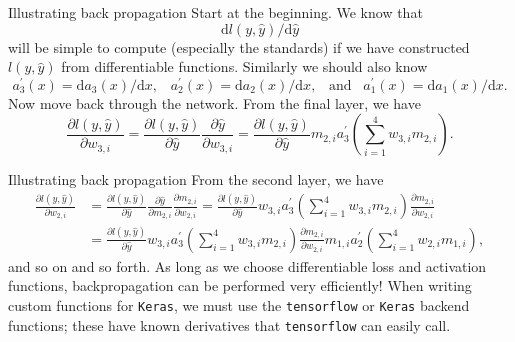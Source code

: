 \documentclass{beamer}
\begin{document}
\begin{frame}{Illustrating back propagation}
Start at the beginning. We know that
\[
\mathrm{d} l(y,\hat{y}) / \mathrm{d}\hat{y}
\] 
will be simple to compute (especially the standards) if we have constructed $l(y,\hat{y}) $ from differentiable functions. Similarly we should also know
\[
a_3^{'}(x)=\mathrm{d}a_3(x)/\mathrm{d}x,\;\;\; a_2^{'}(x)=\mathrm{d}a_2(x)/\mathrm{d}x,\;\;\;\text{and} \;\;\;a_1^{'}(x)=\mathrm{d}a_1(x)/\mathrm{d}x.
\]
Now move back through the network. From the final layer, we  have
\[
\frac{\partial l(y,\hat{y})}{\partial w_{3,i}} = \frac{\partial l(y,\hat{y}) }{\partial \hat{y}}\frac{\partial \hat{y} }{\partial w_{3,i}}= \frac{\partial l(y,\hat{y}) }{\partial \hat{y}}m_{2,i}a_3^{'}\left(\sum^4_{i=1}w_{3,i}m_{2,i}\right).
\]
\end{frame}
\begin{frame}{Illustrating back propagation}
From the second layer, we have
\begin{align*}
\frac{\partial l(y,\hat{y})}{\partial w_{2,i}}& = \frac{\partial l(y,\hat{y}) }{\partial \hat{y}}\frac{\partial \hat{y} }{\partial m_{2,i}}\frac{\partial m_{2,i} }{\partial w_{2,i}}=\frac{\partial l(y,\hat{y}) }{\partial \hat{y}}w_{3,i}a_3^{'}\left(\sum^4_{i=1}w_{3,i}m_{2,i}\right)\frac{\partial m_{2,i} }{\partial w_{2,i}}\\
&=\frac{\partial l(y,\hat{y}) }{\partial \hat{y}}w_{3,i}a_3^{'}\left(\sum^4_{i=1}w_{3,i}m_{2,i}\right)\frac{\partial m_{2,i} }{\partial w_{2,i}}m_{1,i}a_2^{'}\left(\sum^4_{i=1}w_{2,i}m_{1,i}\right),
\end{align*}
and so on and so forth. As long as we choose differentiable loss and activation functions, backpropagation can be performed very efficiently!\linebreak
When writing custom functions for \texttt{Keras}, we must use the \texttt{tensorflow} or  \texttt{Keras} backend functions; these have known derivatives that \texttt{tensorflow} can easily call.
\end{frame}
\end{document}
